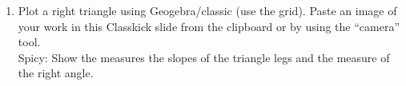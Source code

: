 \documentclass[12pt, twoside]{article}
\begin{document}
\begin{enumerate}
\newpage
\item Plot a right triangle using Geogebra/classic (use the grid). Paste an image of your work in this Classkick slide from the clipboard or by using the ``camera'' tool.\\[0.25cm]
Spicy: Show the measures the slopes of the triangle legs and the measure of the right angle.

    
\end{enumerate}
\end{document}
